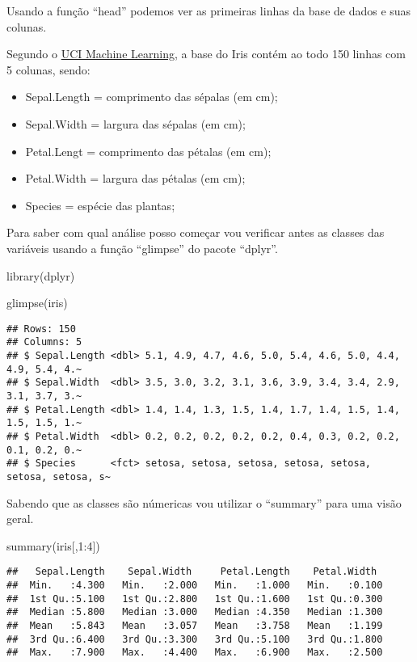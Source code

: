 \documentclass[
]{book}
\newenvironment{Shaded}{\begin{snugshade}}{\end{snugshade}}
\newcommand{\DecValTok}[1]{\textcolor[rgb]{0.00,0.00,0.81}{#1}}
\newcommand{\FunctionTok}[1]{\textcolor[rgb]{0.00,0.00,0.00}{#1}}
\newcommand{\NormalTok}[1]{#1}
\newcommand{\SpecialCharTok}[1]{\textcolor[rgb]{0.00,0.00,0.00}{#1}}
\providecommand{\tightlist}{%
  \setlength{\itemsep}{0pt}\setlength{\parskip}{0pt}}
\begin{document}
Usando a função ``head'' podemos ver as primeiras linhas da base de dados e suas colunas.

Segundo o \href{https://archive.ics.uci.edu/ml/datasets/iris}{UCI Machine Learning}, a base do Iris contém ao todo 150 linhas com 5 colunas, sendo:

\begin{itemize}
\tightlist
\item
  Sepal.Length = comprimento das sépalas (em cm);
\item
  Sepal.Width = largura das sépalas (em cm);
\item
  Petal.Lengt = comprimento das pétalas (em cm);
\item
  Petal.Width = largura das pétalas (em cm);
\item
  Species = espécie das plantas;
\end{itemize}

Para saber com qual análise posso começar vou verificar antes as classes das variáveis usando a função ``glimpse'' do pacote ``dplyr''.

\begin{Shaded}
\begin{Highlighting}[]
\FunctionTok{library}\NormalTok{(dplyr)}

\FunctionTok{glimpse}\NormalTok{(iris)}
\end{Highlighting}
\end{Shaded}

\begin{verbatim}
## Rows: 150
## Columns: 5
## $ Sepal.Length <dbl> 5.1, 4.9, 4.7, 4.6, 5.0, 5.4, 4.6, 5.0, 4.4, 4.9, 5.4, 4.~
## $ Sepal.Width  <dbl> 3.5, 3.0, 3.2, 3.1, 3.6, 3.9, 3.4, 3.4, 2.9, 3.1, 3.7, 3.~
## $ Petal.Length <dbl> 1.4, 1.4, 1.3, 1.5, 1.4, 1.7, 1.4, 1.5, 1.4, 1.5, 1.5, 1.~
## $ Petal.Width  <dbl> 0.2, 0.2, 0.2, 0.2, 0.2, 0.4, 0.3, 0.2, 0.2, 0.1, 0.2, 0.~
## $ Species      <fct> setosa, setosa, setosa, setosa, setosa, setosa, setosa, s~
\end{verbatim}

Sabendo que as classes são númericas vou utilizar o ``summary'' para uma visão geral.

\begin{Shaded}
\begin{Highlighting}[]
\FunctionTok{summary}\NormalTok{(iris[,}\DecValTok{1}\SpecialCharTok{:}\DecValTok{4}\NormalTok{])}
\end{Highlighting}
\end{Shaded}

\begin{verbatim}
##   Sepal.Length    Sepal.Width     Petal.Length    Petal.Width   
##  Min.   :4.300   Min.   :2.000   Min.   :1.000   Min.   :0.100  
##  1st Qu.:5.100   1st Qu.:2.800   1st Qu.:1.600   1st Qu.:0.300  
##  Median :5.800   Median :3.000   Median :4.350   Median :1.300  
##  Mean   :5.843   Mean   :3.057   Mean   :3.758   Mean   :1.199  
##  3rd Qu.:6.400   3rd Qu.:3.300   3rd Qu.:5.100   3rd Qu.:1.800  
##  Max.   :7.900   Max.   :4.400   Max.   :6.900   Max.   :2.500
\end{verbatim}
\end{document}
